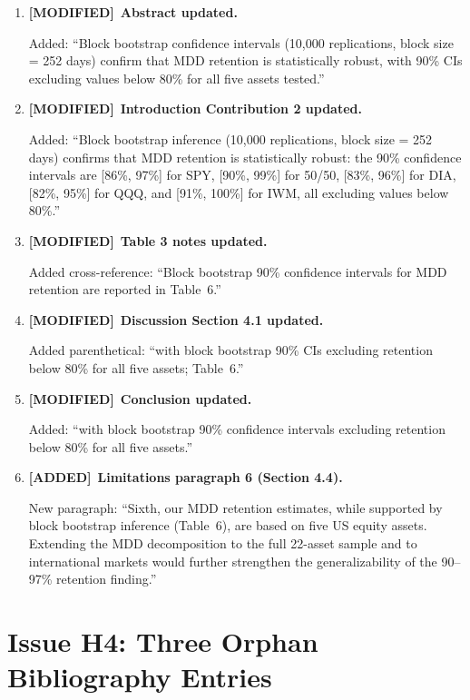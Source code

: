 \documentclass[12pt,a4paper]{article}
\newcommand{\ADDED}{\textcolor{added}{\textbf{[ADDED]}}}
\newcommand{\MODIFIED}{\textcolor{modified}{\textbf{[MODIFIED]}}}
\begin{document}
\begin{enumerate}[label=\arabic*.]
\item \MODIFIED\ \textbf{Abstract updated.}

Added: ``Block bootstrap confidence intervals (10,000 replications, block size = 252 days) confirm that MDD retention is statistically robust, with 90\% CIs excluding values below 80\% for all five assets tested.''

\item \MODIFIED\ \textbf{Introduction Contribution 2 updated.}

Added: ``Block bootstrap inference (10,000 replications, block size = 252 days) confirms that MDD retention is statistically robust: the 90\% confidence intervals are [86\%, 97\%] for SPY, [90\%, 99\%] for 50/50, [83\%, 96\%] for DIA, [82\%, 95\%] for QQQ, and [91\%, 100\%] for IWM, all excluding values below 80\%.''

\item \MODIFIED\ \textbf{Table 3 notes updated.}

Added cross-reference: ``Block bootstrap 90\% confidence intervals for MDD retention are reported in Table~6.''

\item \MODIFIED\ \textbf{Discussion Section 4.1 updated.}

Added parenthetical: ``with block bootstrap 90\% CIs excluding retention below 80\% for all five assets; Table~6.''

\item \MODIFIED\ \textbf{Conclusion updated.}

Added: ``with block bootstrap 90\% confidence intervals excluding retention below 80\% for all five assets.''

\item \ADDED\ \textbf{Limitations paragraph 6 (Section 4.4).}

New paragraph: ``Sixth, our MDD retention estimates, while supported by block bootstrap inference (Table~6), are based on five US equity assets. Extending the MDD decomposition to the full 22-asset sample and to international markets would further strengthen the generalizability of the 90--97\% retention finding.''

\end{enumerate}


\section{Issue H4: Three Orphan Bibliography Entries}
\end{document}
